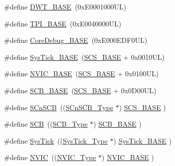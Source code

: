\begin{DoxyCompactItemize}
\item 
\#define \mbox{\hyperlink{group___c_m_s_i_s__core__base_gafdab534f961bf8935eb456cb7700dcd2}{D\+W\+T\+\_\+\+B\+A\+SE}}~(0x\+E0001000\+U\+L)
\item 
\#define \mbox{\hyperlink{group___c_m_s_i_s__core__base_ga2b1eeff850a7e418844ca847145a1a68}{T\+P\+I\+\_\+\+B\+A\+SE}}~(0x\+E0040000\+U\+L)
\item 
\#define \mbox{\hyperlink{group___c_m_s_i_s__core__base_ga680604dbcda9e9b31a1639fcffe5230b}{Core\+Debug\+\_\+\+B\+A\+SE}}~(0x\+E000\+E\+D\+F0\+U\+L)
\item 
\#define \mbox{\hyperlink{group___c_m_s_i_s__core__base_ga58effaac0b93006b756d33209e814646}{Sys\+Tick\+\_\+\+B\+A\+SE}}~(\mbox{\hyperlink{group___c_m_s_i_s__core__base_ga3c14ed93192c8d9143322bbf77ebf770}{S\+C\+S\+\_\+\+B\+A\+SE}} +  0x0010\+U\+L)
\item 
\#define \mbox{\hyperlink{group___c_m_s_i_s__core__base_gaa0288691785a5f868238e0468b39523d}{N\+V\+I\+C\+\_\+\+B\+A\+SE}}~(\mbox{\hyperlink{group___c_m_s_i_s__core__base_ga3c14ed93192c8d9143322bbf77ebf770}{S\+C\+S\+\_\+\+B\+A\+SE}} +  0x0100\+U\+L)
\item 
\#define \mbox{\hyperlink{group___c_m_s_i_s__core__base_gad55a7ddb8d4b2398b0c1cfec76c0d9fd}{S\+C\+B\+\_\+\+B\+A\+SE}}~(\mbox{\hyperlink{group___c_m_s_i_s__core__base_ga3c14ed93192c8d9143322bbf77ebf770}{S\+C\+S\+\_\+\+B\+A\+SE}} +  0x0\+D00\+U\+L)
\item 
\#define \mbox{\hyperlink{group___c_m_s_i_s__core__base_ga9fe0cd2eef83a8adad94490d9ecca63f}{S\+Cn\+S\+CB}}~((\mbox{\hyperlink{struct_s_cn_s_c_b___type}{S\+Cn\+S\+C\+B\+\_\+\+Type}}    $\ast$)     \mbox{\hyperlink{group___c_m_s_i_s__core__base_ga3c14ed93192c8d9143322bbf77ebf770}{S\+C\+S\+\_\+\+B\+A\+SE}}      )
\item 
\#define \mbox{\hyperlink{group___c_m_s_i_s__core__base_gaaaf6477c2bde2f00f99e3c2fd1060b01}{S\+CB}}~((\mbox{\hyperlink{struct_s_c_b___type}{S\+C\+B\+\_\+\+Type}}       $\ast$)     \mbox{\hyperlink{group___c_m_s_i_s__core__base_gad55a7ddb8d4b2398b0c1cfec76c0d9fd}{S\+C\+B\+\_\+\+B\+A\+SE}}      )
\item 
\#define \mbox{\hyperlink{group___c_m_s_i_s__core__base_gacd96c53beeaff8f603fcda425eb295de}{Sys\+Tick}}~((\mbox{\hyperlink{struct_sys_tick___type}{Sys\+Tick\+\_\+\+Type}}   $\ast$)     \mbox{\hyperlink{group___c_m_s_i_s__core__base_ga58effaac0b93006b756d33209e814646}{Sys\+Tick\+\_\+\+B\+A\+SE}}  )
\item 
\#define \mbox{\hyperlink{group___c_m_s_i_s__core__base_gac8e97e8ce56ae9f57da1363a937f8a17}{N\+V\+IC}}~((\mbox{\hyperlink{struct_n_v_i_c___type}{N\+V\+I\+C\+\_\+\+Type}}      $\ast$)     \mbox{\hyperlink{group___c_m_s_i_s__core__base_gaa0288691785a5f868238e0468b39523d}{N\+V\+I\+C\+\_\+\+B\+A\+SE}}     )

\end{DoxyCompactItemize}

